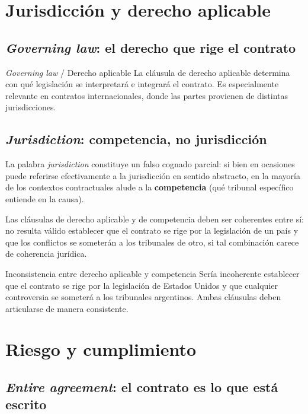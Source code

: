 \documentclass[12pt,oneside]{book}
\begin{document}
\section{Jurisdicción y derecho aplicable}

\subsection{\textit{Governing law}: el derecho que rige el contrato}

\begin{definition}{\textit{Governing law} / Derecho aplicable}
La cláusula de derecho aplicable determina con qué legislación se interpretará e integrará el contrato. Es especialmente relevante en contratos internacionales, donde las partes provienen de distintas jurisdicciones.
\end{definition}

\subsection{\textit{Jurisdiction}: competencia, no jurisdicción}

La palabra \textit{jurisdiction} constituye un falso cognado parcial: si bien en ocasiones puede referirse efectivamente a la jurisdicción en sentido abstracto, en la mayoría de los contextos contractuales alude a la \textbf{competencia} (qué tribunal específico entiende en la causa).

Las cláusulas de derecho aplicable y de competencia deben ser coherentes entre sí: no resulta válido establecer que el contrato se rige por la legislación de un país y que los conflictos se someterán a los tribunales de otro, si tal combinación carece de coherencia jurídica.

\begin{example}{Inconsistencia entre derecho aplicable y competencia}
Sería incoherente establecer que el contrato se rige por la legislación de Estados Unidos y que cualquier controversia se someterá a los tribunales argentinos. Ambas cláusulas deben articularse de manera consistente.
\end{example}

\section{Riesgo y cumplimiento}

\subsection{\textit{Entire agreement}: el contrato es lo que está escrito}
\end{document}
